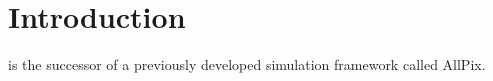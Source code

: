 \section{Introduction}
\apsq is the successor of a previously developed simulation framework called AllPix\cite{ap1wiki}\cite{ap1git}.
